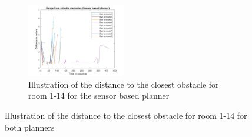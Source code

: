 \documentclass[../Head/Main.tex]{subfiles}
\begin{document}
\begin{figure}[H]
\begin{subfigure}[b]{0.99\textwidth}
    \centering
    \includegraphics[width=0.47\textwidth]{PlotSensorBasedObstacle}
    \caption{Illustration of the distance to the closest obstacle for room 1-14 for the sensor based planner}
    \label{fig:Sensor 1}
  \end{subfigure}
  \caption{Illustration of the distance to the closest obstacle for room 1-14 for both planners}
\end{figure}
\end{document}
